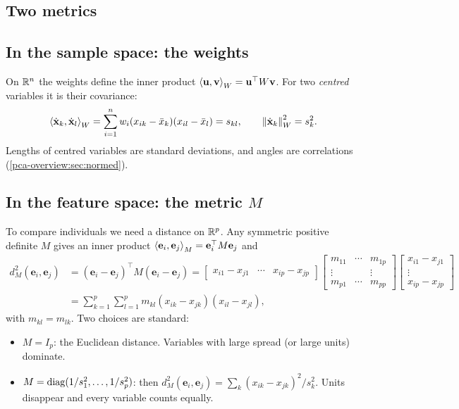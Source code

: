 \begin{notechapter}
\section{Two metrics}\label{pca-overview:sec:metrics}

\subsection{In the sample space: the weights}

On $\mathbb{R}^n$ the weights define the inner product $\left\langle \mathbf u, \mathbf v \right\rangle_W = \mathbf u^\top W\mathbf v$.
For two \emph{centred} variables it is their covariance:
\[
  \left\langle \dot{\mathbf x}_k, \dot{\mathbf x}_l \right\rangle_W = \sum_{i=1}^nw_i(x_{ik} - \bar x_k)(x_{il} - \bar x_l) = s_{kl},
  \qquad \left\|\dot{\mathbf x}_k\right\|_W^2 = s_k^2 .
\]
Lengths of centred variables are standard deviations, and angles are correlations
(\cref{pca-overview:sec:normed}).

\subsection{In the feature space: the metric $M$}

To compare individuals we need a distance on $\mathbb{R}^p$. Any symmetric positive definite
$M$ gives an inner product $\left\langle \mathbf e_i, \mathbf e_j \right\rangle_M = \mathbf e_i^\top M\mathbf e_j$ and
\begin{align*}
  d_M^2(\mathbf e_i,\mathbf e_j) &= (\mathbf e_i - \mathbf e_j)^\top M(\mathbf e_i - \mathbf e_j)
  = \begin{bmatrix}x_{i1} - x_{j1} & \cdots & x_{ip} - x_{jp}\end{bmatrix}
    \begin{bmatrix}
      m_{11} & \cdots & m_{1p}\\
      \vdots & & \vdots\\
      m_{p1} & \cdots & m_{pp}
    \end{bmatrix}
    \begin{bmatrix}x_{i1} - x_{j1}\\ \vdots\\ x_{ip} - x_{jp}\end{bmatrix}\\
  &= \sum_{k=1}^p\sum_{l=1}^pm_{kl}(x_{ik} - x_{jk})(x_{il} - x_{jl}),
\end{align*}
with $m_{kl} = m_{lk}$. Two choices are standard:
\begin{itemize}
  \item $M = I_p$: the Euclidean distance. Variables with large spread (or large units)
        dominate.
  \item $M = \operatorname{diag}(1/s_1^2,\dots,1/s_p^2)$: then
        $d_M^2(\mathbf e_i,\mathbf e_j) = \sum_k(x_{ik} - x_{jk})^2/s_k^2$. Units disappear and every
        variable counts equally.
\end{itemize}


\end{notechapter}
